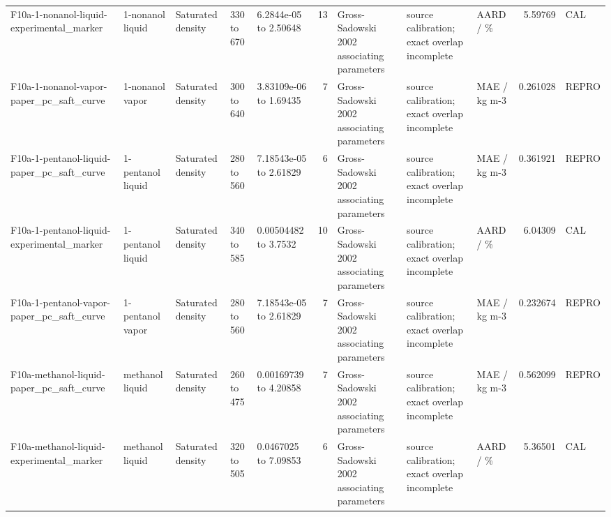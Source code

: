 \begin{landscape}
\begin{longtable}{L{1.9cm}L{2.5cm}L{2.1cm}L{1.6cm}L{1.6cm}rL{2.4cm}L{1.9cm}L{2.2cm}rL{1cm}}
F10a-\allowbreak{}1-\allowbreak{}nonanol-\allowbreak{}liquid-\allowbreak{}experimental\_\allowbreak{}marker & 1-\allowbreak{}nonanol liquid & Saturated density & 330 to 670 & 6.2844e-\allowbreak{}05 to 2.50648 & 13 & Gross-\allowbreak{}Sadowski 2002 associating parameters & source calibration; exact overlap incomplete & AARD /\allowbreak{} \% & 5.59769 & CAL \\
F10a-\allowbreak{}1-\allowbreak{}nonanol-\allowbreak{}vapor-\allowbreak{}paper\_\allowbreak{}pc\_\allowbreak{}saft\_\allowbreak{}curve & 1-\allowbreak{}nonanol vapor & Saturated density & 300 to 640 & 3.83109e-\allowbreak{}06 to 1.69435 & 7 & Gross-\allowbreak{}Sadowski 2002 associating parameters & source calibration; exact overlap incomplete & MAE /\allowbreak{} kg m-\allowbreak{}3 & 0.261028 & REPRO \\
F10a-\allowbreak{}1-\allowbreak{}pentanol-\allowbreak{}liquid-\allowbreak{}paper\_\allowbreak{}pc\_\allowbreak{}saft\_\allowbreak{}curve & 1-\allowbreak{}pentanol liquid & Saturated density & 280 to 560 & 7.18543e-\allowbreak{}05 to 2.61829 & 6 & Gross-\allowbreak{}Sadowski 2002 associating parameters & source calibration; exact overlap incomplete & MAE /\allowbreak{} kg m-\allowbreak{}3 & 0.361921 & REPRO \\
F10a-\allowbreak{}1-\allowbreak{}pentanol-\allowbreak{}liquid-\allowbreak{}experimental\_\allowbreak{}marker & 1-\allowbreak{}pentanol liquid & Saturated density & 340 to 585 & 0.00504482 to 3.7532 & 10 & Gross-\allowbreak{}Sadowski 2002 associating parameters & source calibration; exact overlap incomplete & AARD /\allowbreak{} \% & 6.04309 & CAL \\
F10a-\allowbreak{}1-\allowbreak{}pentanol-\allowbreak{}vapor-\allowbreak{}paper\_\allowbreak{}pc\_\allowbreak{}saft\_\allowbreak{}curve & 1-\allowbreak{}pentanol vapor & Saturated density & 280 to 560 & 7.18543e-\allowbreak{}05 to 2.61829 & 7 & Gross-\allowbreak{}Sadowski 2002 associating parameters & source calibration; exact overlap incomplete & MAE /\allowbreak{} kg m-\allowbreak{}3 & 0.232674 & REPRO \\
F10a-\allowbreak{}methanol-\allowbreak{}liquid-\allowbreak{}paper\_\allowbreak{}pc\_\allowbreak{}saft\_\allowbreak{}curve & methanol liquid & Saturated density & 260 to 475 & 0.00169739 to 4.20858 & 7 & Gross-\allowbreak{}Sadowski 2002 associating parameters & source calibration; exact overlap incomplete & MAE /\allowbreak{} kg m-\allowbreak{}3 & 0.562099 & REPRO \\
F10a-\allowbreak{}methanol-\allowbreak{}liquid-\allowbreak{}experimental\_\allowbreak{}marker & methanol liquid & Saturated density & 320 to 505 & 0.0467025 to 7.09853 & 6 & Gross-\allowbreak{}Sadowski 2002 associating parameters & source calibration; exact overlap incomplete & AARD /\allowbreak{} \% & 5.36501 & CAL \\

\end{longtable}
\end{landscape}

